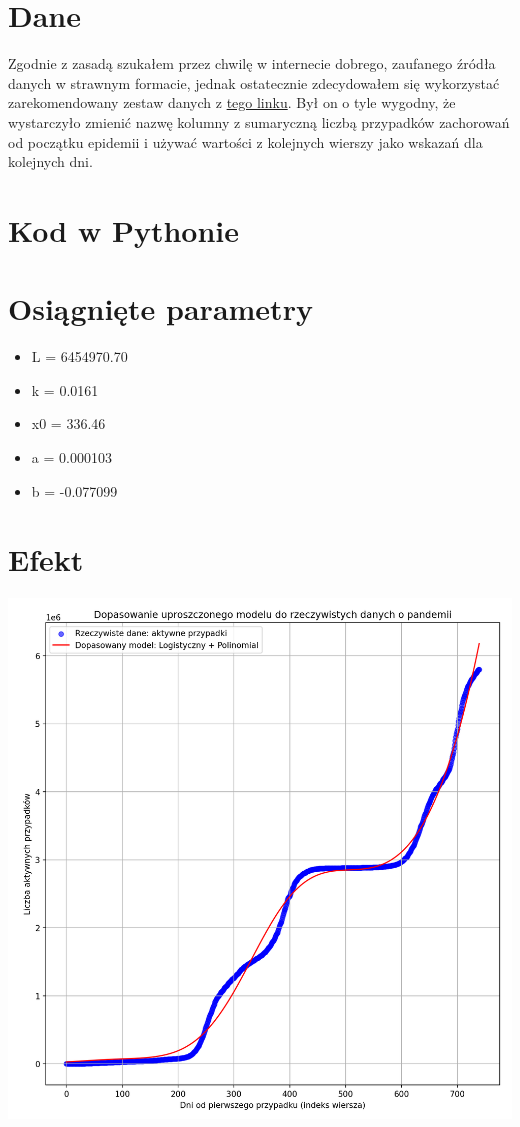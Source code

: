 \documentclass{article}
\begin{document}
\section{Dane}
Zgodnie z zasadą  szukałem przez chwilę w internecie dobrego, zaufanego źródła danych w strawnym formacie, jednak ostatecznie zdecydowałem się wykorzystać zarekomendowany zestaw danych z
\href{https://docs.google.com/spreadsheets/d/1ierEhD6gcq51HAm433knjnVwey4ZE5DCnu1bW7PRG3E/edit?gid=1400401584#gid=1400401584}
{tego linku}. Był on o tyle wygodny, że wystarczyło zmienić nazwę kolumny z sumaryczną liczbą przypadków zachorowań od początku epidemii i używać wartości z kolejnych wierszy jako wskazań dla kolejnych dni.

\pagebreak
\section{Kod w Pythonie}


\section{Osiągnięte parametry}
\begin{itemize}
    \item L = 6454970.70
    \item k = 0.0161
    \item x0 = 336.46
    \item a = 0.000103
    \item b = -0.077099
\end{itemize}

\section{Efekt}
\includegraphics[width=\textwidth]{9.png}
\end{document}
